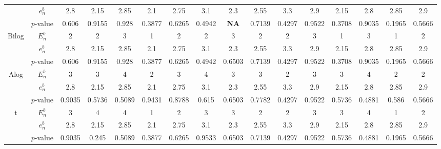 \begin{landscape}
\begin{table}[H]
\begin{tabular}{cc|cccccccccccccc}
                        & $e_n^b$   & 2.8    & 2.15   & 2.85            & 2.1             & 2.75   & 3.1    & 2.3         & 2.55   & 3.3             & 2.9    & 2.15   & 2.8    & 2.85   & 2.9    \\
                        & $p$-value & 0.606  & 0.9155 & 0.928           & 0.3877          & 0.6265 & 0.4942 & \textbf{NA} & 0.7139 & 0.4297          & 0.9522 & 0.3708 & 0.9035 & 0.1965 & 0.5666 \\ \hline
\multirow{3}{*}{Bilog}  & $E_n^b$   & 2      & 2      & 3               & 1               & 2      & 2      & 3           & 2      & 2               & 3      & 1      & 3      & 1      & 2      \\
                        & $e_n^b$   & 2.8    & 2.15   & 2.85            & 2.1             & 2.75   & 3.1    & 2.3         & 2.55   & 3.3             & 2.9    & 2.15   & 2.8    & 2.85   & 2.9    \\
                        & $p$-value & 0.606  & 0.9155 & 0.928           & 0.3877          & 0.6265 & 0.4942 & 0.6503      & 0.7139 & 0.4297          & 0.9522 & 0.3708 & 0.9035 & 0.1965 & 0.5666 \\ \hline
\multirow{3}{*}{Alog}   & $E_n^b$   & 3      & 3      & 4               & 2               & 3      & 4      & 3           & 3      & 2               & 3      & 3      & 4      & 2      & 2      \\
                        & $e_n^b$   & 2.8    & 2.15   & 2.85            & 2.1             & 2.75   & 3.1    & 2.3         & 2.55   & 3.3             & 2.9    & 2.15   & 2.8    & 2.85   & 2.9    \\
                        & $p$-value & 0.9035 & 0.5736 & 0.5089          & 0.9431          & 0.8788 & 0.615  & 0.6503      & 0.7782 & 0.4297          & 0.9522 & 0.5736 & 0.4881 & 0.586  & 0.5666 \\ \hline
\multirow{3}{*}{t}      & $E_n^b$   & 3      & 4      & 4               & 1               & 2      & 3      & 3           & 2      & 2               & 3      & 3      & 4      & 1      & 2      \\
                        & $e_n^b$   & 2.8    & 2.15   & 2.85            & 2.1             & 2.75   & 3.1    & 2.3         & 2.55   & 3.3             & 2.9    & 2.15   & 2.8    & 2.85   & 2.9    \\
                        & $p$-value & 0.9035 & 0.245  & 0.5089          & 0.3877          & 0.6265 & 0.9533 & 0.6503      & 0.7139 & 0.4297          & 0.9522 & 0.5736 & 0.4881 & 0.1965 & 0.5666 \\ \hline

\end{tabular}
\end{table}
\end{landscape}
